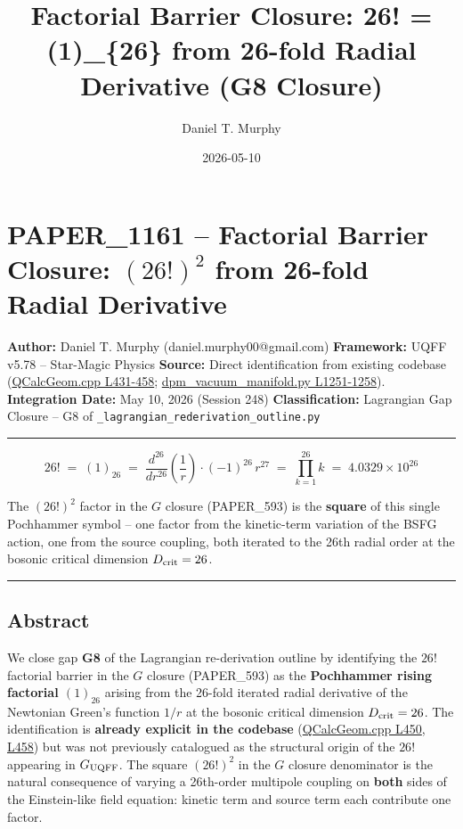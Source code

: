 \documentclass[
]{article}
\title{Factorial Barrier Closure: 26! = (1)\_\{26\} from 26-fold Radial
Derivative (G8 Closure)}
\author{Daniel T. Murphy}
\date{2026-05-10}
\begin{document}
\maketitle

\section{\texorpdfstring{PAPER\_1161 -- Factorial Barrier Closure:
\((26!)^2\) from 26-fold Radial
Derivative}{PAPER\_1161 -- Factorial Barrier Closure: (26!)\^{}2 from 26-fold Radial Derivative}}\label{paper_1161-factorial-barrier-closure-262-from-26-fold-radial-derivative}

\textbf{Author:} Daniel T. Murphy (daniel.murphy00@gmail.com)
\textbf{Framework:} UQFF v5.78 -- Star-Magic Physics \textbf{Source:}
Direct identification from existing codebase
(\href{QCalcGeom.cpp\#L431}{QCalcGeom.cpp L431-458};
\href{dpm_vacuum_manifold.py\#L1251}{dpm\_vacuum\_manifold.py
L1251-1258}). \textbf{Integration Date:} May 10, 2026 (Session 248)
\textbf{Classification:} Lagrangian Gap Closure -- G8 of
\texttt{\_lagrangian\_rederivation\_outline.py}

\begin{center}\rule{0.5\linewidth}{0.5pt}\end{center}

\[\boxed{\;26! \;=\; (1)_{26} \;=\; \frac{d^{26}}{dr^{26}}\!\left(\frac{1}{r}\right) \cdot (-1)^{26}\,r^{27} \;=\; \prod_{k=1}^{26} k \;=\; 4.0329 \times 10^{26}\;}\]

The \((26!)^2\) factor in the \(G\) closure (PAPER\_593) is the
\textbf{square} of this single Pochhammer symbol -- one factor from the
kinetic-term variation of the BSFG action, one from the source coupling,
both iterated to the 26th radial order at the bosonic critical dimension
\(D_{\rm crit}=26\).

\begin{center}\rule{0.5\linewidth}{0.5pt}\end{center}

\subsection{Abstract}\label{abstract}

We close gap \textbf{G8} of the Lagrangian re-derivation outline by
identifying the \(26!\) factorial barrier in the \(G\) closure
(PAPER\_593) as the \textbf{Pochhammer rising factorial \((1)_{26}\)}
arising from the 26-fold iterated radial derivative of the Newtonian
Green's function \(1/r\) at the bosonic critical dimension
\(D_{\rm crit} = 26\). The identification is \textbf{already explicit in
the codebase} (\href{QCalcGeom.cpp\#L450}{QCalcGeom.cpp L450},
\href{QCalcGeom.cpp\#L458}{L458}) but was not previously catalogued as
the structural origin of the \(26!\) appearing in \(G_{\rm UQFF}\). The
square \((26!)^2\) in the \(G\) closure denominator is the natural
consequence of varying a 26th-order multipole coupling on \textbf{both}
sides of the Einstein-like field equation: kinetic term and source term
each contribute one factor.
\end{document}

